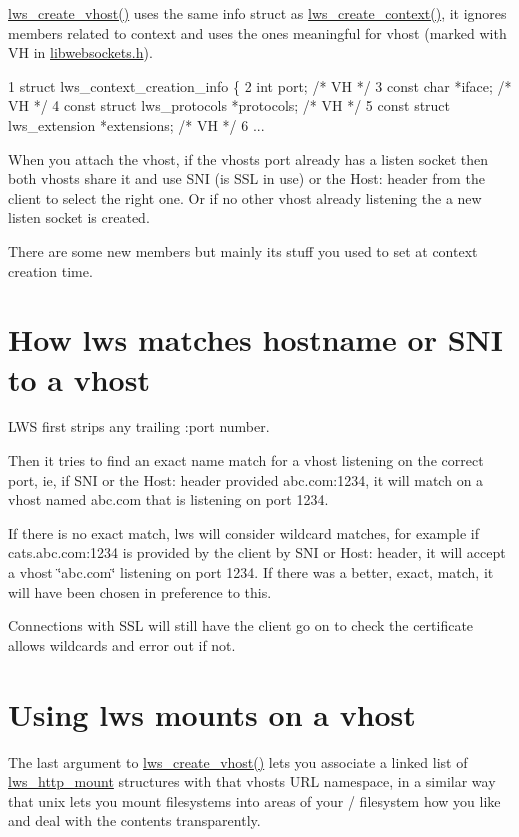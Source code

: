 \hyperlink{group__context-and-vhost_ga0c54c667ccd9b8b3dddcd123ca72f87c}{lws\+\_\+create\+\_\+vhost()} uses the same info struct as \hyperlink{group__context-and-vhost_gaf2fff58562caab7510c41eeac85a8648}{lws\+\_\+create\+\_\+context()}, it ignores members related to context and uses the ones meaningful for vhost (marked with VH in \hyperlink{libwebsockets_8h}{libwebsockets.\+h}).


\begin{DoxyCode}
1 struct lws\_context\_creation\_info \{
2         int port;                                       /* VH */
3         const char *iface;                              /* VH */
4         const struct lws\_protocols *protocols;          /* VH */
5         const struct lws\_extension *extensions;         /* VH */
6 ...
\end{DoxyCode}


When you attach the vhost, if the vhost\textquotesingle{}s port already has a listen socket then both vhosts share it and use S\+NI (is S\+SL in use) or the Host\+: header from the client to select the right one. Or if no other vhost already listening the a new listen socket is created.

There are some new members but mainly it\textquotesingle{}s stuff you used to set at context creation time.\hypertarget{md_README.coding_sni}{}\section{How lws matches hostname or S\+N\+I to a vhost}\label{md_README.coding_sni}
L\+WS first strips any trailing \+:port number.

Then it tries to find an exact name match for a vhost listening on the correct port, ie, if S\+NI or the Host\+: header provided abc.\+com\+:1234, it will match on a vhost named abc.\+com that is listening on port 1234.

If there is no exact match, lws will consider wildcard matches, for example if cats.\+abc.\+com\+:1234 is provided by the client by S\+NI or Host\+: header, it will accept a vhost \char`\"{}abc.\+com\char`\"{} listening on port 1234. If there was a better, exact, match, it will have been chosen in preference to this.

Connections with S\+SL will still have the client go on to check the certificate allows wildcards and error out if not.\hypertarget{md_README.coding_mounts}{}\section{Using lws mounts on a vhost}\label{md_README.coding_mounts}
The last argument to \hyperlink{group__context-and-vhost_ga0c54c667ccd9b8b3dddcd123ca72f87c}{lws\+\_\+create\+\_\+vhost()} lets you associate a linked list of \hyperlink{structlws__http__mount}{lws\+\_\+http\+\_\+mount} structures with that vhost\textquotesingle{}s U\+RL \textquotesingle{}namespace\textquotesingle{}, in a similar way that unix lets you mount filesystems into areas of your / filesystem how you like and deal with the contents transparently.


